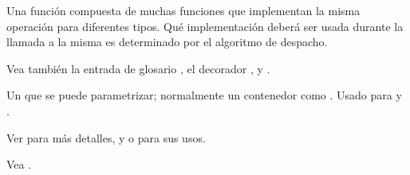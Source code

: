 \documentclass[a4,10pt,spanish]{sphinxmanual}
\begin{document}
\begin{description}
\begin{sphinxVerbatim}[commandchars=\\\{\}]
             
\end{sphinxVerbatim}

\item[{función genérica\index{función genérica@\spxentry{función genérica}|spxpagem}\phantomsection\label{\detokenize{glossary:term-generic-function}}}] \leavevmode
\sphinxAtStartPar
Una función compuesta de muchas funciones que implementan la misma operación para diferentes tipos. Qué implementación deberá ser usada durante la llamada a la misma es determinado por el algoritmo de despacho.

\sphinxAtStartPar
Vea también la entrada de glosario {\hyperref[\detokenize{glossary:term-single-dispatch}]{}}, el decorador , y .

\item[{tipos genéricos\index{tipos genéricos@\spxentry{tipos genéricos}|spxpagem}\phantomsection\label{\detokenize{glossary:term-generic-type}}}] \leavevmode
\sphinxAtStartPar
Un {\hyperref[\detokenize{glossary:term-type}]{}} que se puede parametrizar; normalmente un contenedor como . Usado para {\hyperref[\detokenize{glossary:term-type-hint}]{}} y {\hyperref[\detokenize{glossary:term-annotation}]{}}.

\sphinxAtStartPar
Ver  para más detalles, y  o  para sus usos.

\item[{GIL\index{GIL@\spxentry{GIL}|spxpagem}\phantomsection\label{\detokenize{glossary:term-GIL}}}] \leavevmode
\sphinxAtStartPar
Vea {\hyperref[\detokenize{glossary:term-global-interpreter-lock}]{}}.


\end{description}
\end{document}
